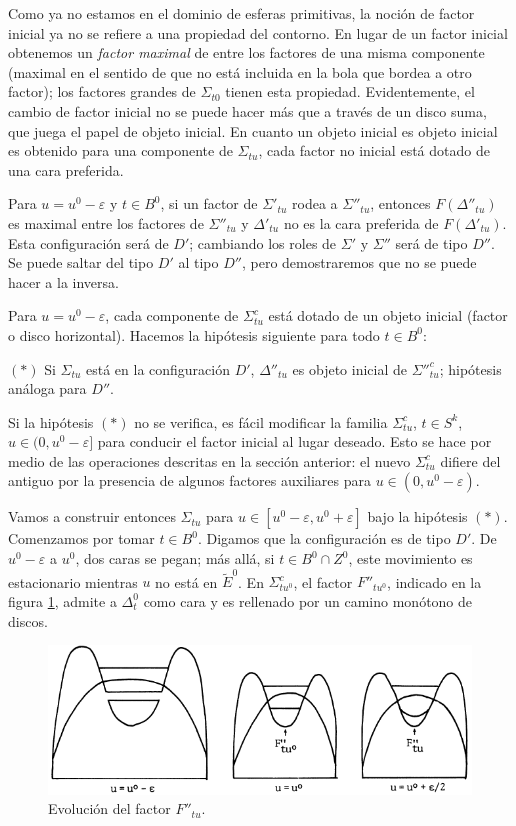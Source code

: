 \documentclass[twoside, 11pt]{article}
\begin{document}
Como ya no estamos en el dominio de esferas primitivas, la noción de factor inicial ya no se refiere a una propiedad del contorno. En lugar de un factor inicial obtenemos un \emph{factor maximal} de entre los factores de una misma componente (maximal en el sentido de que no está incluida en la bola que bordea a otro factor); los factores grandes de $\Sigma_{t0}$ tienen esta propiedad. Evidentemente, el cambio de factor inicial no se puede hacer más que a través de un disco suma, que juega el papel de objeto inicial. En cuanto un objeto inicial es objeto inicial es obtenido para una componente de $\Sigma_{tu}$, cada factor no inicial está dotado de una cara preferida. 

Para $u=u^0-\varepsilon$ y $t\in B^0$, si un factor de $\Sigma'_{tu}$ rodea a $\Sigma''_{tu}$, entonces $F(\Delta''_{tu})$ es maximal entre los factores de $\Sigma''_{tu}$ y $\Delta'_{tu}$ no es la cara preferida de $F(\Delta'_{tu})$. Esta configuración será de $D'$; cambiando los roles de $\Sigma'$ y $\Sigma''$ será de tipo $D''$. Se puede saltar del tipo $D'$ al tipo $D''$, pero demostraremos que no se puede hacer a la inversa.

Para $u=u^0-\varepsilon$, cada componente de $\Sigma_{tu}^c$ está dotado de un objeto inicial (factor o disco horizontal). Hacemos la hipótesis siguiente para todo $t\in B^0$:

$(\ast)$ Si $\Sigma_{tu}$ está en la configuración $D'$, $\Delta''_{tu}$ es objeto inicial de $\Sigma''^c_{tu}$; hipótesis análoga para $D''$.

Si la hipótesis $(\ast)$ no se verifica, es fácil modificar la familia $\Sigma^c_{tu}$, $t\in S^k$, $u\in (0,u^0-\varepsilon]$ para conducir el factor inicial al lugar deseado. Esto se hace por medio de las operaciones descritas en la sección anterior: el nuevo $\Sigma_{tu}^c$ difiere del antiguo por la presencia de algunos factores auxiliares para $u\in (0,u^0-\varepsilon)$. 

Vamos a construir entonces $\Sigma_{tu}$ para $u\in[u^0-\varepsilon, u^0+\varepsilon]$ bajo la hipótesis $(\ast)$. Comenzamos por tomar $t\in B^0$. Digamos que la configuración es de tipo $D'$. De $u^0-\varepsilon$ a $u^0$, dos caras se pegan; más allá, si $t\in B^0\cap Z^0$, este movimiento es estacionario mientras $u$ no está en $\widetilde{E}^0$. En $\Sigma_{tu^0}^c$, el factor $F''_{tu^0}$, indicado en la figura \ref{designe}, admite a $\Delta^0_t$ como cara y es rellenado por un camino monótono de discos. 

\begin{figure}[h!]
\includegraphics[scale=0.7]{designe}
\caption{Evolución del factor $F''_{tu}$.}\label{designe}
\end{figure}
\end{document}
